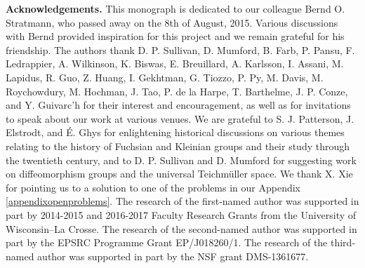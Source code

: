 \bigskip

{\bf Acknowledgements.} This monograph is dedicated to our colleague Bernd O. Stratmann, who passed away on the 8th of August, 2015. Various discussions with Bernd provided inspiration for this project and we remain grateful for his friendship. The authors thank D. P. Sullivan, D. Mumford, B. Farb, P. Pansu, F. Ledrappier, A. Wilkinson, K. Biswas, E. Breuillard, A. Karlsson, I. Assani, M. Lapidus, R. Guo, Z. Huang, I. Gekhtman, G. Tiozzo, P. Py, M. Davis, M. Roychowdury, M. Hochman, J. Tao, P. de la Harpe, T. Barthelme, J. P. Conze, and Y. Guivarc'h for their interest and encouragement, as well as for invitations to speak about our work at various venues. We are grateful to S. J. Patterson, J. Elstrodt, and \'E. Ghys for enlightening historical discussions on various themes relating to the history of Fuchsian and Kleinian groups and their study through the twentieth century, and to D. P. Sullivan and D. Mumford for suggesting work on diffeomorphism groups and the universal Teichm\"uller space. We thank X. Xie for pointing us to a solution to one of the problems in our Appendix \ref{appendixopenproblems}. The research of the first-named author was supported in part by 2014-2015 and 2016-2017 Faculty Research Grants from the University of Wisconsin--La Crosse. The research of the second-named author was supported in part by the EPSRC Programme Grant EP/J018260/1. The research of the third-named author was supported in part by the NSF grant DMS-1361677.

\endinput